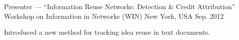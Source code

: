 

\begin{cventries}

  \cventry
    {Presenter — ``Information Reuse Networks: Detection \& Credit Attribution''} %
    {Workshop on Information in Networks (WIN)} %
    {New York, USA} %
    {Sep. 2012} %
    {
      \begin{cvitems} %
        \item {Introduced a new method for tracking idea reuse in text documents.}
      \end{cvitems}
    }

\end{cventries}
